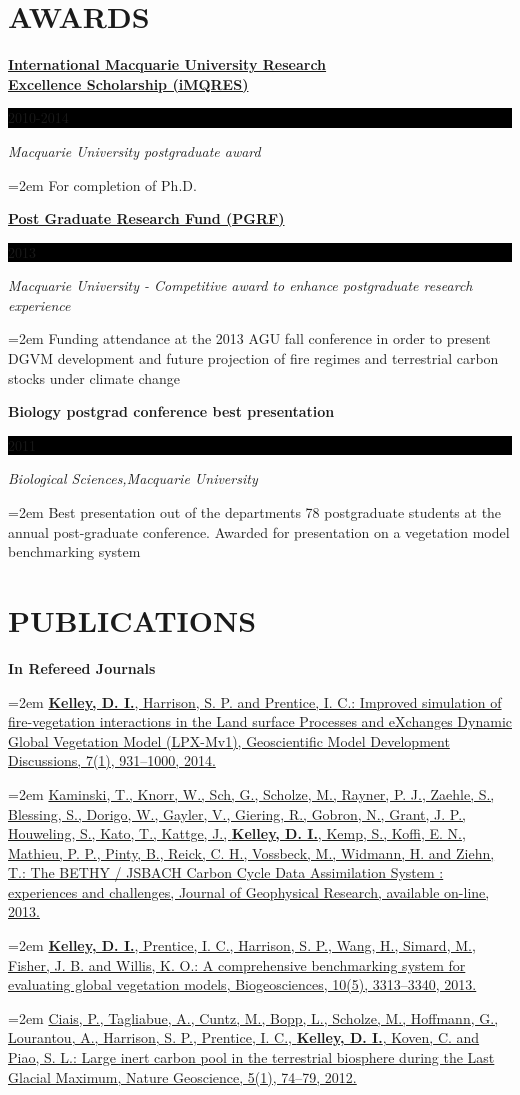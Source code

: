 \documentclass[paper=a4,fontsize=11pt]{scrartcl}	 			%
\newcommand{\sepspace}{\vspace*{1em}}			%
\newcommand{\NewPart}[1]{\section*{\uppercase{#1}}}
\newcommand{\EducationEntry}[4]{
		\noindent \textbf{#1} \hfill 					%
		\colorbox{Black}{%
			\parbox{6.5em}{%
			\hfill\color{White}#2}} \par				%
		\noindent \textit{#3} \par					%
		\noindent\hangindent=2em\hangafter=0 \small #4 	%
		\normalsize \par}
\newcommand{\BibEntry}[2]{
		\noindent \textbf{#1} \hfill \par					%
		\noindent\hangindent=2em\hangafter=0 \small #2 	%
		\normalsize \par}
\begin{document}
  
\NewPart{Awards}
\EducationEntry{\href{http://www.hdr.mq.edu.au/information_about/scholarships}{International Macquarie University Research \\ Excellence Scholarship (iMQRES)}}{2010-2014} {Macquarie University postgraduate award}{For completion of Ph.D.}
\sepspace

\EducationEntry{\href{http://www.hdr.mq.edu.au/information_for/current_candidates/financial_support}{Post Graduate Research Fund (PGRF)}}{2013} {Macquarie University - Competitive award to enhance postgraduate research experience}{Funding attendance at the 2013 AGU fall conference in order to present DGVM development and future projection of fire regimes and terrestrial carbon stocks under climate change}
\sepspace

\EducationEntry{Biology postgrad conference best presentation}{2011} {Biological Sciences,Macquarie University}{Best presentation out of the departments 78 postgraduate students at the annual post-graduate conference. Awarded for presentation on a vegetation model benchmarking system}
  
\pagebreak  
\NewPart{Publications}

\BibEntry{In Refereed Journals}{\href{http://www.geosci-model-dev-discuss.net/7/931/2014/gmdd-7-931-2014.html}{\textbf{Kelley, D. I.}, Harrison, S. P. and Prentice, I. C.: Improved simulation of fire-vegetation interactions in the Land surface Processes and eXchanges Dynamic Global Vegetation Model (LPX-Mv1), Geoscientific Model Development Discussions, 7(1), 931--1000, 2014.}}


\BibEntry{} {\href{http://onlinelibrary.wiley.com/doi/10.1002/jgrg.20118/abstract}{Kaminski, T., Knorr, W., Sch, G., Scholze, M., Rayner, P. J., Zaehle, S., Blessing, S., Dorigo, W., Gayler, V., Giering, R., Gobron, N., Grant, J. P., Houweling, S., Kato, T., Kattge, J., \textbf{Kelley, D. I.}, Kemp, S., Koffi, E. N., Mathieu, P. P., Pinty, B., Reick, C. H., Vossbeck, M., Widmann, H. and Ziehn, T.: The BETHY / JSBACH Carbon Cycle Data Assimilation System : experiences and challenges, Journal of Geophysical Research, available on-line, 2013.}}


\BibEntry{} {\href{http://www.biogeosciences.net/10/3313/2013/bg-10-3313-2013.html}{\textbf{Kelley, D. I.}, Prentice, I. C., Harrison, S. P., Wang, H., Simard, M., Fisher, J. B. and Willis, K. O.: A comprehensive benchmarking system for evaluating global vegetation models, Biogeosciences, 10(5), 3313--3340, 2013.}}


\BibEntry{} {\href{http://www.nature.com/ngeo/journal/v5/n1/full/ngeo1324.html}{Ciais, P., Tagliabue, A., Cuntz, M., Bopp, L., Scholze, M., Hoffmann, G., Lourantou, A., Harrison, S. P., Prentice, I. C., \textbf{Kelley, D. I.}, Koven, C. and Piao, S. L.: Large inert carbon pool in the terrestrial biosphere during the Last Glacial Maximum, Nature Geoscience, 5(1), 74--79, 2012.}}
\end{document}

